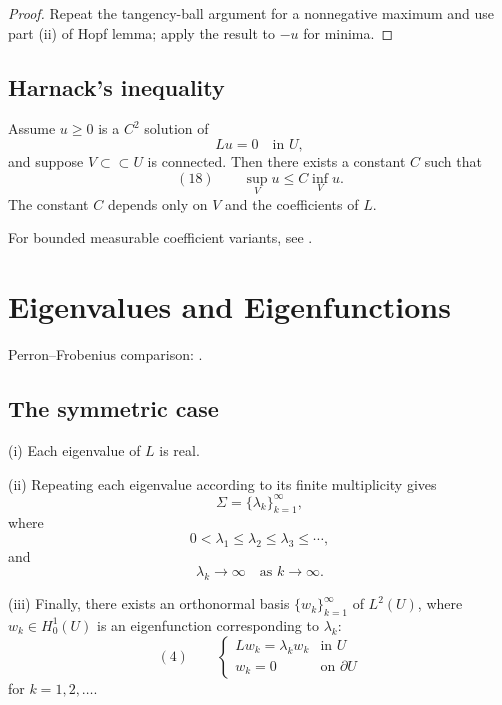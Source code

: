 \begin{proof}
\sketch Repeat the tangency-ball argument for a nonnegative maximum and use part (ii) of Hopf lemma; apply the result to $-u$ for minima.
\end{proof}

\subsection{Harnack's inequality}

\begin{theorem}
\label{thm:harnacks-inequality-elliptic}
Assume $u \geq 0$ is a $C^2$ solution of
$$Lu = 0 \quad \text{in } U,$$
and suppose $V \subset\subset U$ is connected. Then there exists a constant $C$ such that
$$(18) \qquad \sup_V u \leq C\inf_V u.$$
The constant $C$ depends only on $V$ and the coefficients of $L$.
\end{theorem}
For bounded measurable coefficient variants, see \cite{GilbargTrudinger1983}.

\section{Eigenvalues and Eigenfunctions}
\label{sec:elliptic-eigenvalues}
Perron--Frobenius comparison: \cite{Gantmacher1977}.

\subsection{The symmetric case}

\begin{theorem}
\label{thm:existence-eigenvalues-symmetric-operator}

(i) Each eigenvalue of $L$ is real.

(ii) Repeating each eigenvalue according to its finite multiplicity gives
$$\Sigma = \{\lambda_k\}_{k=1}^\infty,$$
where
$$0 < \lambda_1 \leq \lambda_2 \leq \lambda_3 \leq \cdots,$$
and
$$\lambda_k \to \infty \quad \text{as } k \to \infty.$$

(iii) Finally, there exists an orthonormal basis $\{w_k\}_{k=1}^\infty$ of $L^2(U)$, where $w_k \in H_0^1(U)$ is an eigenfunction corresponding to $\lambda_k$:
$$(4) \qquad \begin{cases} Lw_k = \lambda_k w_k & \text{in } U \\ w_k = 0 & \text{on } \partial U \end{cases}$$
for $k = 1,2,\ldots$.
\end{theorem}

